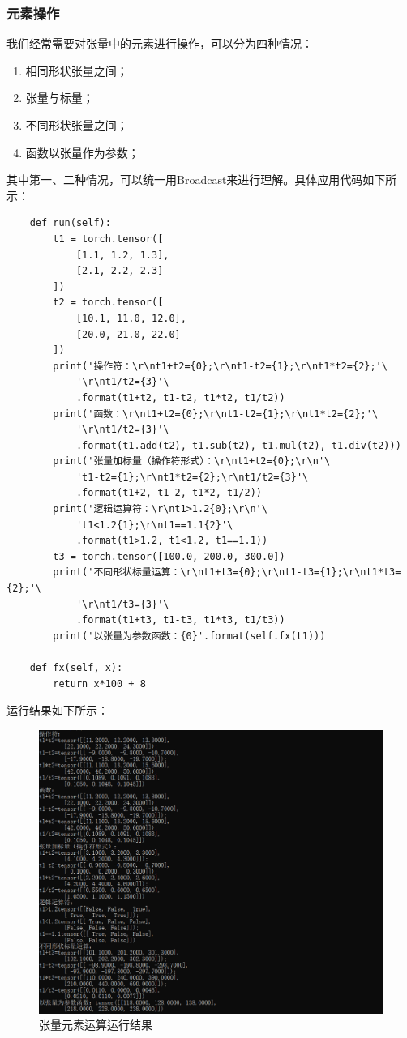 \documentclass[UTF8]{article}
\begin{document}
\subsubsection{元素操作}
我们经常需要对张量中的元素进行操作，可以分为四种情况：
\begin{enumerate}
\item 相同形状张量之间；
\item 张量与标量；
\item 不同形状张量之间；
\item 函数以张量作为参数；
\end{enumerate}
其中第一、二种情况，可以统一用Broadcast来进行理解。具体应用代码如下所示：
\begin{lstlisting}
    def run(self):
        t1 = torch.tensor([
            [1.1, 1.2, 1.3],
            [2.1, 2.2, 2.3]
        ])
        t2 = torch.tensor([
            [10.1, 11.0, 12.0],
            [20.0, 21.0, 22.0]
        ])
        print('操作符：\r\nt1+t2={0};\r\nt1-t2={1};\r\nt1*t2={2};'\
            '\r\nt1/t2={3}'\
            .format(t1+t2, t1-t2, t1*t2, t1/t2))
        print('函数：\r\nt1+t2={0};\r\nt1-t2={1};\r\nt1*t2={2};'\
            '\r\nt1/t2={3}'\
            .format(t1.add(t2), t1.sub(t2), t1.mul(t2), t1.div(t2)))
        print('张量加标量（操作符形式）：\r\nt1+t2={0};\r\n'\
            't1-t2={1};\r\nt1*t2={2};\r\nt1/t2={3}'\
            .format(t1+2, t1-2, t1*2, t1/2))
        print('逻辑运算符：\r\nt1>1.2{0};\r\n'\
            't1<1.2{1};\r\nt1==1.1{2}'\
            .format(t1>1.2, t1<1.2, t1==1.1))
        t3 = torch.tensor([100.0, 200.0, 300.0])
        print('不同形状标量运算：\r\nt1+t3={0};\r\nt1-t3={1};\r\nt1*t3={2};'\
            '\r\nt1/t3={3}'\
            .format(t1+t3, t1-t3, t1*t3, t1/t3))
        print('以张量为参数函数：{0}'.format(self.fx(t1)))

    def fx(self, x):
        return x*100 + 8
\end{lstlisting}
运行结果如下所示：
\begin{figure}[H]
	\caption{张量元素运算运行结果}
	\label{f000006}
	\centering
	\includegraphics[width=15cm]{images/f000006}
\end{figure}
\end{document}
